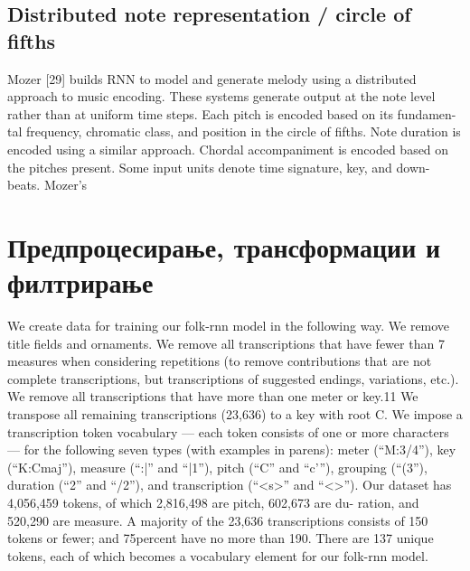 \subsection{Distributed note representation / circle of fifths}

Mozer [29] builds RNN to model and generate melody using a distributed
approach to music encoding. These systems generate output at the note level rather than at uniform time steps. Each pitch is encoded based on its fundamen- tal frequency, chromatic class, and position in the circle of fifths. Note duration is encoded using a similar approach. Chordal accompaniment is encoded based on the pitches present. Some input units denote time signature, key, and down-
beats. Mozer’s

\section{Предпроцесирање, трансформации и филтрирање}

\cite{Sturm2016} We create data for training our folk-rnn model in the following way. We
remove title fields and ornaments. We remove all transcriptions that have fewer than 7 measures when considering repetitions (to remove contributions that are not complete transcriptions, but transcriptions of suggested endings, variations, etc.). We remove all transcriptions that have more than one meter or key.11 We transpose all remaining transcriptions (23,636) to a key with root C.
We impose a transcription token vocabulary — each token consists of one or more characters — for the following seven types (with examples in parens): meter (“M:3/4”), key (“K:Cmaj”), measure (“:|” and “|1”), pitch (“C” and “c’”),
grouping (“(3”), duration (“2” and “/2”), and transcription (“<s>” and “<\s>”). 
Our dataset has 4,056,459 tokens, of which 2,816,498 are pitch, 602,673 are du- ration, and 520,290 are measure. A majority of the 23,636 transcriptions consists of 150 tokens or fewer; and 75percent have no more than 190. There are 137 unique tokens, each of which becomes a vocabulary element for our folk-rnn model.

